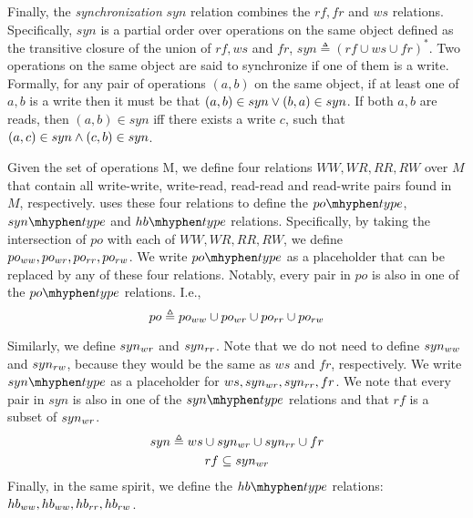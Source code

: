 \custvspace\noindent
Finally, the \emph{synchronization} $syn$ relation combines the $rf, fr$ and $ws$ relations. Specifically, $syn$ is a partial order over operations on the same object defined as the transitive closure of the union of $rf, ws$ and $fr$, \ie $syn \triangleq (rf \cup ws \cup fr)^\ast$. 
Two operations on the same object are said to synchronize if one of them is a write. Formally, for any pair of operations $(a, b)$ on the same object, if at least one of $a, b$ is a write then it must be that $(a, b) \in syn \vee (b,a) \in syn$. If both $a, b$ are reads, then $(a, b) \in syn$ iff there exists a write $c$, such that $(a,c) \in syn \wedge (c, b) \in syn$.


Given the set of operations M, we define four relations $WW, WR, RR, RW$ over $M$ that contain all  write-write, write-read, read-read and read-write pairs found in $M$, respectively.
 uses these four relations to define the $\potype$, $\syntype$ and $\hbtype$ relations. Specifically,
by taking the intersection of $po$ with each of $WW, WR, RR, RW$, we define $po_{ww}, po_{wr},po_{rr}, po_{rw}$. We write $\potype$ as a placeholder that can be replaced by any of these four relations. Notably, every pair in $po$ is also in one of the $\potype$ relations. I.e.,
\begin{equation*}
    po \triangleq po_{ww} \cup po_{wr} \cup po_{rr} \cup po_{rw}
\end{equation*}

Similarly, we define $syn_{wr}$ and $syn_{rr}$. Note that we do not need to define $syn_{ww}$ and $syn_{rw}$, because they would be the same as $ws$ and $fr$, respectively.
We write $\syntype$ as a placeholder for $ws, syn_{wr}, syn_{rr}, fr$.
We note that every pair in $syn$ is also in one of the $\syntype$ relations and that $rf$ is a subset of $syn_{wr}$.
\begin{gather*}
    syn \triangleq ws \cup syn_{wr} \cup syn_{rr} \cup fr\\
    rf \subseteq syn_{wr}
\end{gather*}
Finally, in the same spirit, we define the $\hbtype$ relations: $hb_{ww}, hb_{ww}, hb_{rr},hb_{rw}$.







